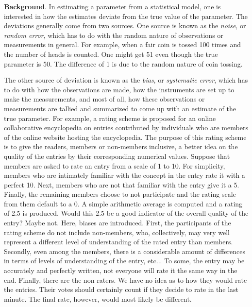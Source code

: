 \documentclass[12pt]{article}
\begin{document}

\textbf{Background}.  In estimating a parameter from a statistical model, one is interested in how the estimates deviate from the true value of the parameter.  The deviations generally come from two sources. One source is known as the \emph{noise}, or \emph{random error}, which has to do with the random nature of observations or measurements in general. For example, when a fair coin is tossed 100 times and the number of heads is counted.  One might get 51 even though the true parameter is 50.  The difference of 1 is due to the random nature of coin tossing.  

The other source of deviation is known as the \emph{bias}, or \emph{systematic error}, which has to do with how the observations are made, how the instruments are set up to make the measurements, and most of all, how these observations or
measurements are tallied and summarized to come up with an estimate of the true parameter.  For example, a rating scheme is proposed for an online collaborative encyclopedia on entries contributed by individuals who are members of the online website hosting the encyclopedia.  The purpose of this rating scheme is to give the readers, members or non-members inclusive, a better idea on the quality of the entries by their corresponding numerical values.  Suppose that members are asked to rate an entry from a scale of 1 to
10. For simplicity, members who are intimately familiar with the concept in the entry rate it with a perfect 10. Next, members who are not that familiar with the entry give it a 5. Finally, the remaining members choose to not participate and the rating scale from them default to a 0.  A simple arithmetic average is computed and a rating of 2.5 is produced. Would this 2.5 be a good indicator
of the overall quality of the entry?  Maybe not. Here, biases are introduced.  First, the participants of the rating scheme do not include non-members, who, collectively, may very well represent a different level of understanding of the rated entry than members.  Secondly, even among the members, there is a considerable amount of differences in terms of levels of understanding of the entry, etc...  To some, the entry may be accurately and perfectly written, not
everyone will rate it the same way in the end. Finally, there are the non-raters.  We have no idea as to how they would rate the entries.  Their votes should certainly count if they decide to rate in the last minute.  The final rate, however, would most likely be different.  
\end{document}
